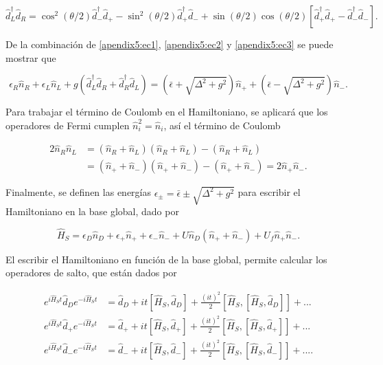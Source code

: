 \begin{appendixs}
\begin{equation}
    \hat{d}^{\dagger}_{L}\hat{d}_{R} = \cos^{2}(\theta/2)\hat{d}^{\dagger}_{-}\hat{d}_{+} - \sin^{2}(\theta/2) \hat{d}^{\dagger}_{+}\hat{d}_{-}  + \sin(\theta/2)\cos(\theta/2)[ \hat{d}^{\dagger}_{+}\hat{d}_{+} - \hat{d}^{\dagger}_{-}\hat{d}_{-} ].
    \label{apendix5:ec3}
\end{equation}

De la combinación de \ref{apendix5:ec1}, \ref{apendix5:ec2} y \ref{apendix5:ec3} se puede mostrar que 

\begin{equation*}
    \epsilon_{R} \hat{n}_{R} + \epsilon_{L} \hat{n}_{L} + g( \hat{d}^{\dagger}_{L}\hat{d}_{R} + \hat{d}^{\dagger}_{R}\hat{d}_{L} ) = (\bar{\epsilon} + \sqrt{\Delta^{2} + g^{2}})\hat{n}_{+} +  (\bar{\epsilon} - \sqrt{\Delta^{2} + g^{2}})\hat{n}_{-}.
\end{equation*}

Para trabajar el término de Coulomb en el Hamiltoniano, se aplicará que los operadores de Fermi cumplen $\hat{n}^{2}_{i} = \hat{n}_{i}$, así el término de Coulomb 

\begin{align*}
    2 \hat{n}_{R}\hat{n}_{L} & = (\hat{n}_{R} +\hat{n}_{L})(\hat{n}_{R} +\hat{n}_{L}) - (\hat{n}_{R} + \hat{n}_{L}) \\
    & = (\hat{n}_{+} +\hat{n}_{-})(\hat{n}_{+} +\hat{n}_{-}) - (\hat{n}_{+} + \hat{n}_{-})  = 2\hat{n}_{+}\hat{n}_{-}.
\end{align*}

Finalmente, se definen las energías $\epsilon_{\pm} = \bar{\epsilon} \pm \sqrt{\Delta^{2}+g^{2}}$ para escribir el Hamiltoniano en la base global, dado por 

\begin{equation}
    \hat{H}_{S} = \epsilon_{D}\hat{n}_{D} + \epsilon_{+}\hat{n}_{+} + \epsilon_{-}\hat{n}_{-} + U\hat{n}_{D}(\hat{n}_{+} + \hat{n}_{-}) + U_{f}\hat{n}_{+}\hat{n}_{-}.
    \label{apendix5:ec4}
\end{equation}

El escribir el Hamiltoniano en función de la base global, permite calcular los operadores de salto, que están dados por 

\begin{align*}
    e^{i \hat{H}_{S}t}\hat{d}_{D}e^{-i\hat{H}_{S}t} & = \hat{d}_{D} + it[\hat{H}_{S},\hat{d}_{D}] + \frac{(it)^{2}}{2} [\hat{H}_{S},[\hat{H}_{S},\hat{d}_{D}]] +... \\
    e^{i \hat{H}_{S}t}\hat{d}_{+}e^{-i\hat{H}_{S}t} & = \hat{d}_{+} + it[\hat{H}_{S},\hat{d}_{+}] + \frac{(it)^{2}}{2} [\hat{H}_{S},[\hat{H}_{S},\hat{d}_{+}]] +... \\
    e^{i \hat{H}_{S}t}\hat{d}_{-}e^{-i\hat{H}_{S}t} & = \hat{d}_{-} + it[\hat{H}_{S},\hat{d}_{-}] + \frac{(it)^{2}}{2} [\hat{H}_{S},[\hat{H}_{S},\hat{d}_{-}]] +....
\end{align*}


\end{appendixs}
